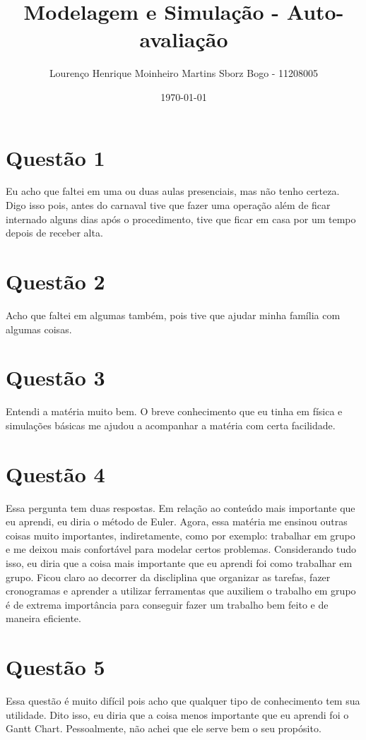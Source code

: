 \documentclass[11pt]{article}
\author{Lourenço Henrique Moinheiro Martins Sborz Bogo - 11208005}
\date{\today}
\title{Modelagem e Simulação - Auto-avaliação}
\begin{document}
\maketitle
\tableofcontents

\newpage
\section{Questão 1}
\label{sec:org22293ae}
Eu acho que faltei em uma ou duas aulas presenciais, mas não tenho certeza.
Digo isso pois, antes do carnaval tive que fazer uma operação além de ficar
internado alguns dias após o procedimento, tive que ficar em casa por um tempo
depois de receber alta.

\section{Questão 2}
\label{sec:org3f209ba}
Acho que faltei em algumas também, pois tive que ajudar minha família com algumas coisas.

\section{Questão 3}
\label{sec:org74f1d9b}
Entendi a matéria muito bem. O breve conhecimento que eu tinha em física e
simulações básicas me ajudou a acompanhar a matéria com certa facilidade.

\section{Questão 4}
\label{sec:org0eb7ab1}
Essa pergunta tem duas respostas. Em relação ao conteúdo mais importante 
que eu aprendi, eu diria o método de Euler. Agora, essa matéria me ensinou
outras coisas muito importantes, indiretamente, como por exemplo: 
trabalhar em grupo e me deixou mais confortável para modelar certos
problemas. Considerando tudo isso, eu diria que a coisa mais importante
que eu aprendi foi como trabalhar em grupo. Ficou claro ao decorrer da
discliplina que organizar as tarefas, fazer cronogramas e aprender 
a utilizar ferramentas que auxiliem o trabalho em grupo é de extrema
importância para conseguir fazer um trabalho bem feito e de maneira
eficiente.

\section{Questão 5}
\label{sec:org7b4428c}
Essa questão é muito difícil pois acho que qualquer tipo de conhecimento
tem sua utilidade. Dito isso, eu diria que a coisa menos importante que
eu aprendi foi o Gantt Chart. Pessoalmente, não achei que ele serve bem
o seu propósito.
\end{document}
